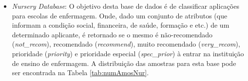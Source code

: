 \documentclass[12pt]{article}
\begin{document}
\begin{itemize}
                \begin{table}[h]
                    \centering
                    \caption{Quantidade de amostras por classe da base de dados "Mushroom Database".}
                    \label{tab:numAmosMus}
                \end{table}
            
            \item \textit{Nursery Database}: O objetivo desta base de dados é de classificar aplicações para escolas de enfermagem. Onde, dado um conjunto de atributos (que informam a condição social, financeira, de saúde, formação e etc.) de um determinado aplicante, é retornado se o mesmo é não-recomendado (\textit{not\_recom}), recomendado (\textit{recommend}), muito recomendado (\textit{very\_recom}), prioridade (\textit{priority}) e prioridade especial (\textit{spec\_prior}) à entrar na instituição de ensino de enfermagem. A distribuição das amostras para esta base pode ser encontrada na Tabela \ref{tab:numAmosNur}.
            
                 \begin{table}[h]
                    \centering
                    \caption{Quantidade de amostras por classe da base de dados "Nursery Database".}
                    \label{tab:numAmosNur}
                \end{table}
                
        \end{itemize}
        
\end{document}
